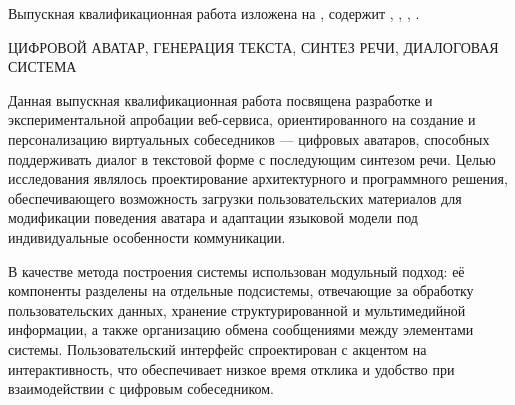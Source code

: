 

Выпускная квалификационная работа изложена на  
,
содержит
,
,
, 
.
\bigskip

\noindent
ЦИФРОВОЙ АВАТАР, ГЕНЕРАЦИЯ ТЕКСТА, СИНТЕЗ РЕЧИ, ДИАЛОГОВАЯ СИСТЕМА
\bigskip

%

Данная выпускная квалификационная работа посвящена разработке и экспериментальной апробации веб-сервиса, ориентированного на создание и персонализацию виртуальных собеседников — цифровых аватаров, способных поддерживать диалог в текстовой форме с последующим синтезом речи. Целью исследования являлось проектирование архитектурного и программного решения, обеспечивающего возможность загрузки пользовательских материалов для модификации поведения аватара и адаптации языковой модели под индивидуальные особенности коммуникации.

В качестве метода построения системы использован модульный подход: её компоненты разделены на отдельные подсистемы, отвечающие за обработку пользовательских данных, хранение структурированной и мультимедийной информации, а также организацию обмена сообщениями между элементами системы. Пользовательский интерфейс спроектирован с акцентом на интерактивность, что обеспечивает низкое время отклика и удобство при взаимодействии с цифровым собеседником.

